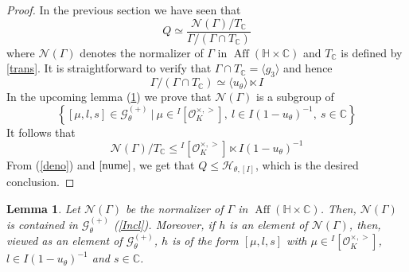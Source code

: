 \documentclass[12pt]{amsart}
\newtheorem{lemma}{Lemma}[section]
\newcommand{\C}{\mathbb{C}}
\newcommand{\HH}{\mathbb{H}}
\newcommand{\OO}{\mathcal{O}}
\newcommand{\Nc}{\mathcal{N}}
\DeclareMathOperator{\Aff}{Aff}
\begin{document}
\begin{proof}
In the previous section we have seen that 
$$Q \simeq \frac{\Nc(\Gamma)/T_\C}{\Gamma/(\Gamma \cap T_\C)}$$
where $\Nc(\Gamma)$ denotes the normalizer of $\Gamma $ in $\Aff(\HH \times \C)$ and $T_\C$ is defined by \ref{trans}. It is straightforward to verify that $\Gamma \cap T_\C = \langle g_3 \rangle $ and hence
\begin{equation}\label{deno}
\Gamma/ (\Gamma \cap T_\C) \simeq \langle u_\theta\rangle \ltimes I
\end{equation}
In the upcoming lemma (\ref{norm}) we prove that $\Nc(\Gamma)$ is a subgroup of 
$$\left\{[\mu,l,s]\in \mathcal{G}^{(+)}_\theta\ \vert\ \mu \in {}^I[\OO_K^{\times, >}],\ l \in I(1-u_\theta)^{-1},\ s\in \C\right\}$$
It follows that 
\begin{equation}\label{nume}
\Nc(\Gamma)/T_\C \leq {}^I[\OO_K^{\times, >}] \ltimes I(1-u_\theta)^{-1}
\end{equation}
From (\ref{deno}) and $\ref{nume}$, we get that $ Q \leq \mathcal{H}_{\theta,[I]}$, which is the desired conclusion.
\end{proof}













\begin{lemma}\label{norm} 
Let  $\Nc(\Gamma)$ be the normalizer of $\Gamma$ in $\Aff(\HH \times \C)$. Then, $\Nc(\Gamma)$ is contained in $\mathcal{G}^{(+)}_\theta$ (\ref{Incl}). Moreover, if $h$ is an element of $\Nc(\Gamma)$, then, viewed as an element of $\mathcal{G}_{\theta}^{(+)}$, $h$ is of the form $[\mu,l,s]$ with $\mu \in {}^I[\OO_K^{\times, >}]$, $l \in I(1-u_\theta)^{-1}$ and $s \in \C$.
\end{lemma}
\end{document}
